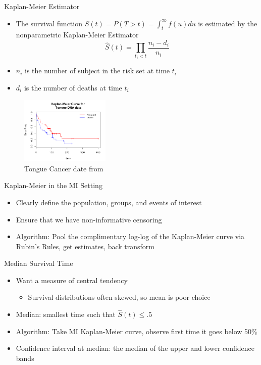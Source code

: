 \begin{frame}{Kaplan-Meier Estimator}
\begin{itemize}
 \item The survival function $S(t)=P(T>t)=\int_{t}^{\infty}f(u)du$ is estimated by the 
 nonparametric Kaplan-Meier Estimator
 $$\hat{S}(t)=\prod_{t_i<t}\frac{n_i -d_i}{n_i}$$
\item $n_i$ is the number of subject in the risk set at time $t_i$
\item $d_i$ is the number of deaths at time $t_i$
\end{itemize}
 \begin{figure}[h!]
  \centering
    \includegraphics[width=0.38\textwidth]{km_example.png}
  \caption{Tongue Cancer date from \cite{Klein1984}}
\label{fig:KMcurve}
\end{figure}
\end{frame}




\begin{frame}{Kaplan-Meier in the MI Setting}
 \begin{itemize}
  \item Clearly define the population, groups, and events of interest
  \item Ensure that we have non-informative censoring
\item Algorithm: Pool the complimentary log-log of the Kaplan-Meier curve via Rubin's Rules, get estimates,
back transform \cite{Marshall2009}
 \end{itemize}
\end{frame}


\begin{frame}{Median Survival Time}
 \begin{itemize}
  \item Want a measure of central tendency
  \begin{itemize}
   \item Survival distributions often skewed, so mean is poor choice
  \end{itemize}
  \item Median: smallest time such that $\hat{S}(t)\leq .5$
\item Algorithm: Take MI Kaplan-Meier curve, observe first time it goes below 50\%
\item Confidence interval at median: the median of the upper and lower confidence bands
 \end{itemize}

\end{frame}

